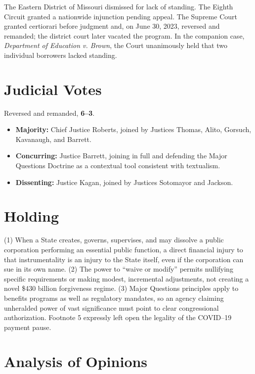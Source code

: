 \documentclass[12pt]{article}
\begin{document}
The Eastern District of Missouri dismissed for lack of standing. The Eighth Circuit granted a nationwide injunction pending appeal. The Supreme Court granted certiorari before judgment and, on June 30, 2023, reversed and remanded; the district court later vacated the program. In the companion case, \textit{Department of Education v. Brown}, the Court unanimously held that two individual borrowers lacked standing.

\section{Judicial Votes}

Reversed and remanded, \textbf{6--3}.
\begin{itemize}
\item \textbf{Majority:} Chief Justice Roberts, joined by Justices Thomas, Alito, Gorsuch, Kavanaugh, and Barrett.
\item \textbf{Concurring:} Justice Barrett, joining in full and defending the Major Questions Doctrine as a contextual tool consistent with textualism.
\item \textbf{Dissenting:} Justice Kagan, joined by Justices Sotomayor and Jackson.
\end{itemize}

\section{Holding}

(1) When a State creates, governs, supervises, and may dissolve a public corporation performing an essential public function, a direct financial injury to that instrumentality is an injury to the State itself, even if the corporation can sue in its own name. (2) The power to ``waive or modify'' permits nullifying specific requirements or making modest, incremental adjustments, not creating a novel \$430 billion forgiveness regime. (3) Major Questions principles apply to benefits programs as well as regulatory mandates, so an agency claiming unheralded power of vast significance must point to clear congressional authorization. Footnote 5 expressly left open the legality of the COVID--19 payment pause.

\section{Analysis of Opinions}
\end{document}
